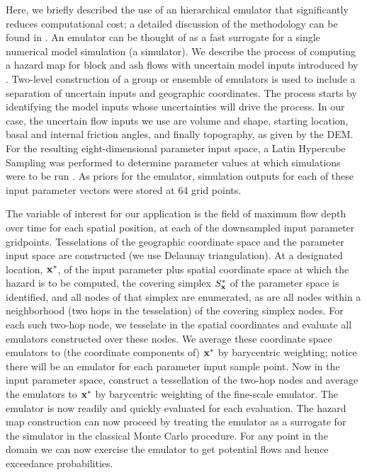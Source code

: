 \documentclass[12pt]{article}
\begin{document}
Here, we briefly described the use of an hierarchical emulator that
significantly reduces computational cost; a detailed discussion of the
methodology can be found in \citet{dalbeythesis, Keith}. An emulator
can be thought of as a fast surrogate for a single numerical model
simulation (a simulator).  We describe the process of computing a
hazard map for block and ash flows with uncertain model inputs
introduced by \citet{dalbeythesis}.  Two-level construction of a group
or ensemble of emulators is used to include a separation of uncertain
inputs and geographic coordinates.  The process starts by identifying
the model inputs whose uncertainties will drive the process. In our
case, the uncertain flow inputs we use are volume and shape, starting
location, basal and internal friction angles, and finally topography,
as given by the DEM.  For the resulting eight-dimensional parameter
input space, a Latin Hypercube Sampling was performed to determine
parameter values at which simulations were to be run \citep{Mitasova1996}. As
priors for the emulator, simulation outputs for each of these input
parameter vectors were stored at 64 grid points.


The variable of interest for our application is the field of maximum
flow depth over time for each spatial position, at each of the
downsampled input parameter gridpoints.  Tesselations of the
geographic coordinate space and the parameter input space are
constructed (we use Delaunay triangulation).  At a designated
location, ${\bf x}^*$, of the input parameter plus spatial coordinate
space at which the hazard is to be computed, the covering simplex
$S_{\bf x}^* $ of the parameter space is identified, and all nodes of
that simplex are enumerated, as are all nodes within a neighborhood
(two hops in the tesselation) of the covering simplex nodes.  For each
such two-hop node, we tesselate in the spatial coordinates and
evaluate all emulators constructed over these nodes.  We average these
coordinate space emulators to (the coordinate components of) ${\bf
  x}^*$ by barycentric weighting; notice there will be an emulator for
each parameter input sample point. Now in the input parameter space,
construct a tessellation of the two-hop nodes and average the
emulators to ${\bf x}^*$ by barycentric weighting of the fine-scale
emulator.  The emulator is now readily and quickly evaluated for each
evaluation. The hazard map construction can now proceed by treating
the emulator as a surrogate for the simulator in the classical Monte
Carlo procedure.  For any point in the domain we can now exercise the
emulator to get potential flows and hence exceedance probabilities.
\end{document}
